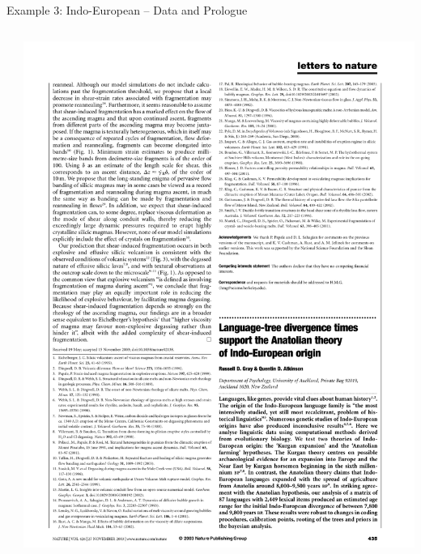 \documentclass[9pt]{beamer}
\begin{document}
\begin{frame}{Example 3: Indo-European – Data and Prologue}
  \begin{columns}
    \begin{column}{0.5\textwidth}
      
        \footnotemark
    \end{column}
    \begin{column}{0.5\textwidth}
      \footnotemark\includegraphics[width=\textwidth,page=3,trim={2.2cm 4.6cm 2.7cm 5.0cm},clip]{gray2003language.pdf}
    \end{column}
  \end{columns}
\end{frame}
\end{document}
